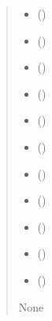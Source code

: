 \documentclass[a4paper,11pt,english,openany]{sphinxmanual}
\begin{document}
\begin{fulllineitems}
\begin{fulllineitems}
\begin{quote}
\begin{description}
\begin{itemize}
\item {} 
\sphinxAtStartPar
{} ()

\item {} 
\sphinxAtStartPar
{} ()

\item {} 
\sphinxAtStartPar
{} ()

\item {} 
\sphinxAtStartPar
{} ()

\item {} 
\sphinxAtStartPar
{} ()

\item {} 
\sphinxAtStartPar
{} ()

\item {} 
\sphinxAtStartPar
{} ()

\item {} 
\sphinxAtStartPar
{} ()

\item {} 
\sphinxAtStartPar
{} ()

\item {} 
\sphinxAtStartPar
{} ()

\item {} 
\sphinxAtStartPar
{} ()

\end{itemize}

\sphinxAtStartPar
None

\end{description}\end{quote}


\end{fulllineitems}
\end{fulllineitems}
\end{document}
